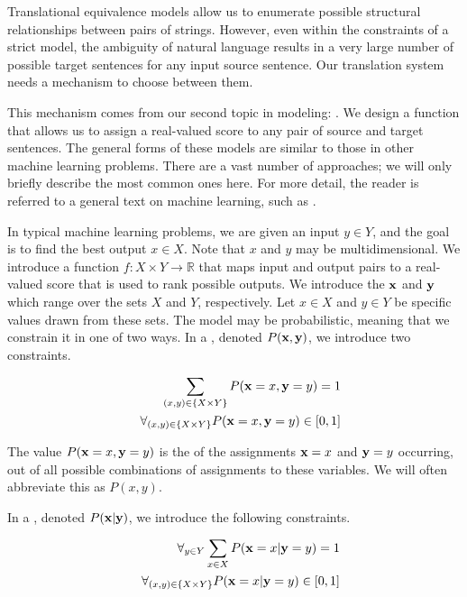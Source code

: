 Translational equivalence models allow us to enumerate
possible structural relationships between pairs
of strings.
However, even within the constraints of a strict
model, the ambiguity of natural language
results in a very large number of possible target sentences for any 
input source sentence.  Our translation
system needs a mechanism to choose between them.

This mechanism comes from our second topic in modeling: .
We design a function that allows us to assign a real-valued score 
to any pair of source and target sentences.  The
general forms of these models are similar to those in other machine 
learning problems.  There are a vast number of approaches;
we will only briefly describe the most common ones here.
For more detail, the reader is referred to a general text 
on machine learning, such as \citet{Mitchell:1997:book}.

In typical machine learning problems, we are given 
an input $y \in Y$, and the goal is to 
find the best output $x \in X$.  Note that $x$ and
$y$ may be multidimensional.   We introduce 
a function $f: X \times Y \rightarrow \mathbb{R}$
that maps input and output pairs to a real-valued score
that is used to rank possible outputs.
We introduce the  ${\bf x}$ and
${\bf y}$ which range over the sets $X$ and $Y$,
respectively.  Let $x \in X$ and $y \in Y$
be specific values drawn from these sets. 
The model may be probabilistic,
meaning that we constrain it in one of two ways.
In a , denoted $P({\bf x},{\bf y})$, 
we introduce two constraints.

\begin{eqnarray*} 
&&\sum_{(x,y) \in \{X \times Y\}} P({\bf x}=x,{\bf y}=y) = 1\\
&&\forall_{(x,y) \in \{X \times Y\}}P({\bf x}=x,{\bf y}=y) \in [0,1]
\end{eqnarray*}

\noindent The value $P({\bf x}=x,{\bf y}=y)$ is the
 of the assignments ${\bf x}=x$
and ${\bf y}=y$ occurring, out of all possible
combinations of assignments to these variables.
We will often abbreviate this as $P(x,y)$.

In a ,
denoted $P({\bf x}|{\bf y})$, we introduce the following constraints.

\begin{eqnarray*}
&&\forall_{y \in Y} \sum_{x \in X} P({\bf x}=x|{\bf y}=y) = 1\\
&&\forall_{(x,y) \in \{X \times Y\}}P({\bf x}=x|{\bf y}=y) \in [0,1]
\end{eqnarray*}

